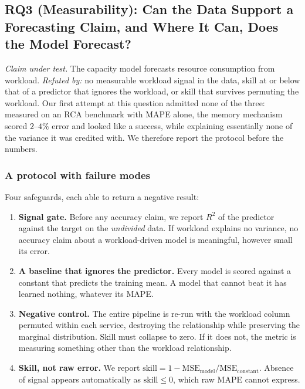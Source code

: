 \documentclass[journal, 10pt]{IEEEtran}
\begin{document}
\subsection{RQ3 (Measurability): Can the Data Support a Forecasting Claim, and Where It Can, Does the Model Forecast?}
\label{sec:rq4}

\emph{Claim under test.} The capacity model forecasts resource consumption from
workload. \emph{Refuted by:} no measurable workload signal in the data, skill at
or below that of a predictor that ignores the workload, or skill that survives
permuting the workload. Our first attempt at this question admitted none of the
three: measured on an RCA
benchmark with MAPE alone, the memory mechanism scored $2$--$4\%$ error and
looked like a success, while explaining essentially none of the variance it was
credited with. We therefore report the protocol before the numbers.

\subsubsection{A protocol with failure modes}
\label{sec:rq4-protocol}
Four safeguards, each able to return a negative result:

\begin{enumerate}
    \item \textbf{Signal gate.} Before any accuracy claim, we report $R^2$ of the
    predictor against the target on the \emph{undivided} data. If workload
    explains no variance, no accuracy claim about a workload-driven model is
    meaningful, however small its error.
    \item \textbf{A baseline that ignores the predictor.} Every model is scored
    against a constant that predicts the training mean. A model that cannot beat
    it has learned nothing, whatever its MAPE.
    \item \textbf{Negative control.} The entire pipeline is re-run with the
    workload column permuted within each service, destroying the relationship
    while preserving the marginal distribution. Skill must collapse to zero. If
    it does not, the metric is measuring something other than the workload
    relationship.
    \item \textbf{Skill, not raw error.} We report
    $\mathrm{skill} = 1 - \mathrm{MSE}_{\text{model}}/\mathrm{MSE}_{\text{constant}}$.
    Absence of signal appears automatically as $\mathrm{skill}\leq 0$, which raw
    MAPE cannot express.
\end{enumerate}
\end{document}
